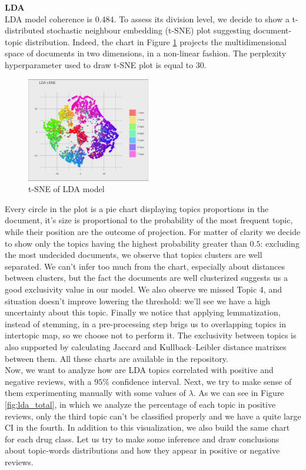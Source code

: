 \documentclass[10pt, a4paper, twocolumn]{article}
\begin{document}
            \textbf{LDA}\\
            LDA model coherence is 0.484. To assess its division level, we decide to show a t-distributed stochastic neighbour embedding (t-SNE) plot suggesting document-topic distribution. Indeed, the chart in Figure \ref{fig:tsne} projects the multidimensional space of documents in two dimensions, in a non-linear fashion. The perplexity hyperparameter used to draw t-SNE plot is equal to 30.
            
            \begin{figure}[!ht]
                \centering
                \includegraphics[width = 0.48\textwidth]{scatterpie2_mod.png}
                \caption{t-SNE of LDA model}
                \label{fig:tsne}
            \end{figure}
            
            Every circle in the plot is a pie chart displaying topics proportions in the document, it's size is proportional to the probability of the most frequent topic, while their position are the outcome of projection. For matter of clarity we decide to show only the topics having the highest probability greater than $0.5$: excluding the most undecided documents, we observe that topics clusters are well separated. We can't infer too much from the chart, especially about distances between clusters, but the fact the documents are well clusterized suggests us a good exclusivity value in our model. We also observe we missed Topic 4, and situation doesn't improve lowering the threshold: we'll see we have a high uncertainty about this topic. Finally we notice that applying lemmatization, instead of stemming, in a pre-processing step brigs us to overlapping topics in intertopic map, so we choose not to perform it. The exclusivity between topics is also supported by calculating Jaccard and Kullback–Leibler distance matrixes between them. All these charts are available in the \cite{GitHub_NR} repository.\\
            Now, we want to analyze how are LDA topics correlated with positive and negative reviews, with a $95\%$ confidence interval. Next, we try to make sense of them experimenting manually with some values of $\lambda$. As we can see in Figure \ref{fig:lda_total}, in which we analyze the percentage of each topic in positive reviews, only the third topic can't be classified properly and we have a quite large CI in the fourth. In addition to this visualization, we also build the same chart for each drug class. Let us try to make some inference and draw conclusions about topic-words distributions and how they appear in positive or negative reviews.
\end{document}
